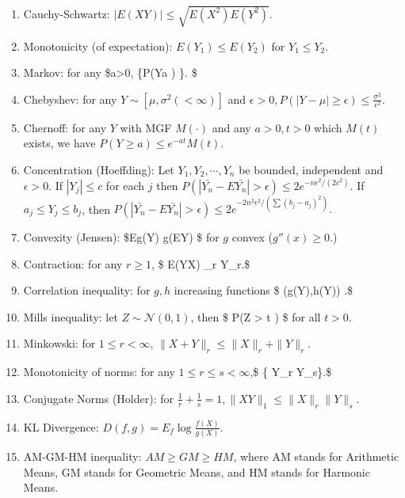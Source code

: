 \documentclass[
  letterpaper,
  DIV=11,
  numbers=noendperiod]{scrreprt}
\newcommand{\N}{\mathcal{N}}
\theoremstyle{plain}
\theoremstyle{definition}
\theoremstyle{remark}
\begin{document}
\begin{enumerate}
\def\labelenumi{\arabic{enumi}.}
\item
  Cauchy-Schwartz: \({|E(XY)| \leq \sqrt{ E(X^2)E(Y^2) }}.\)
\item
  Monotonicity (of expectation): \(E(Y_1) \leq E(Y_2)\) for
  \(Y_1\leq Y_2.\)
\item
  Markov: for any \$a\textgreater0, \{P(\textbar Y\textbar{}\geq a )
  \leq {} \}. \$
\item
  Chebyshev: for any \(Y\sim [\mu,\sigma^2 (<\infty)]\) and
  \(\epsilon>0, {P(|Y-\mu| \geq \epsilon ) \leq \frac{\sigma^2}{\epsilon^2}}.\)
\item
  Chernoff: for any \(Y\) with MGF \(M(\cdot)\) and any \(a>0,t>0\)
  which \(M(t)\) exists, we have \(P(Y\geq a ) \leq e^{-at}M(t).\)
\item
  Concentration (Hoeffding): Let \(Y_1,Y_2,\cdots,Y_n\) be bounded,
  independent and \(\epsilon>0.\) If \(|Y_j|\leq c\) for each \(j\) then
  \(P( |\bar{Y_n} - E\bar{Y_n}|>\epsilon ) \leq 2 e^{-n\epsilon^2 /(2c^2)}.\)
  If \(a_j \leq Y_j \leq b_j\), then
  \(P( |\bar{Y_n} - E\bar{Y_n}|>\epsilon ) \leq 2 e^{-2n^2\epsilon^2 /(\sum (b_j-a_j)^2)}.\)
\item
  Convexity (Jensen): \$Eg(Y) \geq g(EY) \$ for \(g\) convex
  (\(g''(x) \geq 0.\))
\item
  Contraction: for any \(r\geq 1\), \$ \textbar{}
  E(Y\textbar X)\textbar{} \_r \leq \textbar Y\textbar\_r.\$
\item
  Correlation inequality: for \(g,h\) increasing functions \$
  \cor(g(Y),h(Y)) .\$
\item
  Mills inequality: let \(Z \sim \N(0,1)\), then \$ P(Z \textgreater{} t
  ) \leq {}\$ for all \(t>0.\)
\item
  Minkowski: for \(1\leq r <\infty\),
  \(\|X+Y\|_r \leq \|X\|_r + \|Y\|_r.\)
\item
  Monotonicity of norms: for any \(1 \leq r \leq s <\infty\),\$ \{
  \textbar Y\textbar\_r \leq \textbar Y\textbar\_s\}.\$
\item
  Conjugate Norms (Holder): for
  \(\frac{1}{r} + \frac{1}{s}= 1, {\|XY\|_1 \leq \|X\|_r \|Y\|_s}.\)
\item
  KL Divergence: \(D(f,g) = E_f \log \frac{f(X)}{g(X)}.\)
\item
  AM-GM-HM inequality: \(AM \geq GM \geq HM\), where AM stands for
  Arithmetic Means, GM stands for Geometric Means, and HM stands for
  Harmonic Means.
\end{enumerate}
\end{document}
